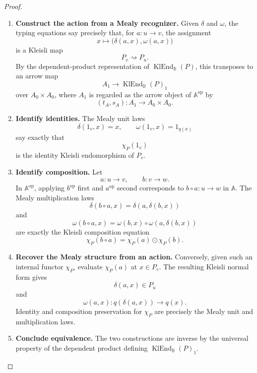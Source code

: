 \begin{proof}
    \leavevmode
    \begin{enumerate}
        \item \textbf{Construct the action from a Mealy recognizer.}
        Given \(\delta\) and \(\omega\), the typing equations say precisely
        that, for \(a:u\to v\), the assignment
        \[
            x\longmapsto
            \bigl(\delta(a,x),\omega(a,x)\bigr)
        \]
        is a Kleisli map
        \[
            P_v\rightsquigarrow P_u.
        \]
        By the dependent-product representation of
        \(\operatorname{KlEnd}_{\mathbb B}(P)\), this transposes to an arrow map
        \[
            A_1\to \operatorname{KlEnd}_{\mathbb B}(P)_1
        \]
        over \(A_0\times A_0\), where \(A_1\) is regarded as the arrow object of
        \(\mathbb A^{\mathrm{op}}\) by
        \[
            (t_A,s_A):A_1\to A_0\times A_0.
        \]

        \item \textbf{Identify identities.}
        The Mealy unit laws
        \[
            \delta(1_v,x)=x,
            \qquad
            \omega(1_v,x)=1_{q(x)}
        \]
        say exactly that
        \[
            \chi_P(1_v)
        \]
        is the identity Kleisli endomorphism of \(P_v\).

        \item \textbf{Identify composition.}
        Let
        \[
            a:u\to v,
            \qquad
            b:v\to w.
        \]
        In \(\mathbb A^{\mathrm{op}}\), applying \(b^{\mathrm{op}}\) first and
        \(a^{\mathrm{op}}\) second corresponds to \(b\circ a:u\to w\) in
        \(\mathbb A\). The Mealy multiplication laws
        \[
            \delta(b\circ a,x)=\delta(a,\delta(b,x))
        \]
        and
        \[
            \omega(b\circ a,x)
            =
            \omega(b,x)\circ\omega(a,\delta(b,x))
        \]
        are exactly the Kleisli composition equation
        \[
            \chi_P(b\circ a)=\chi_P(a)\odot\chi_P(b).
        \]

        \item \textbf{Recover the Mealy structure from an action.}
        Conversely, given such an internal functor \(\chi_P\), evaluate
        \(\chi_P(a)\) at \(x\in P_v\). The resulting Kleisli normal form gives
        \[
            \delta(a,x)\in P_u
        \]
        and
        \[
            \omega(a,x):q(\delta(a,x))\to q(x).
        \]
        Identity and composition preservation for \(\chi_P\) are precisely the
        Mealy unit and multiplication laws.

        \item \textbf{Conclude equivalence.}
        The two constructions are inverse by the universal property of the
        dependent product defining
        \(\operatorname{KlEnd}_{\mathbb B}(P)_1\).
    \end{enumerate}
\end{proof}

